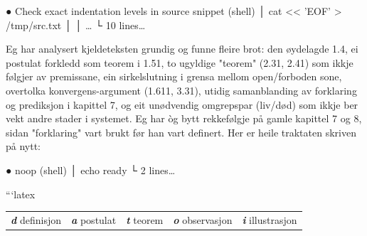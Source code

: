 ● Check exact indentation levels in source snippet (shell)
  │ cat << 'EOF' > /tmp/src.txt
  │ 
  │ …
  └ 10 lines…

Eg har analysert kjeldeteksten grundig og funne fleire brot: den øydelagde 1.4, ei postulat forkledd som teorem i 1.51, to ugyldige "teorem" (2.31, 2.41) som ikkje følgjer av premissane, ein sirkelslutning i grensa mellom open/forboden sone, overtolka konvergens-argument (1.611, 3.31), utidig samanblanding av forklaring og prediksjon i kapittel 7, og eit unødvendig omgrepspar (liv/død) som ikkje ber vekt andre stader i systemet. Eg har òg bytt rekkefølgje på gamle kapittel 7 og 8, sidan "forklaring" vart brukt før han vart definert. Her er heile traktaten skriven på nytt:

● noop (shell)
  │ echo ready
  └ 2 lines…

```latex

\begin{widebody}
\begin{center}\footnotesize
\begin{tabular}{@{}lllll@{}}
\textbf{\textit{d}} definisjon & \textbf{\textit{a}} postulat & \textbf{\textit{t}} teorem & \textbf{\textit{o}} observasjon & \textbf{\textit{i}} illustrasjon \\
\end{tabular}
\end{center}
\end{widebody}

\vspace{6mm}

